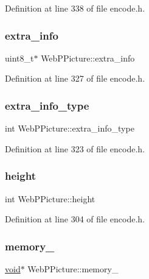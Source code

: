 Definition at line 338 of file encode.\+h.

\mbox{\label{struct_web_p_picture_a869dd7bfe02026edbc6855ea662edf48}} 
\subsubsection{\texorpdfstring{extra\_info}{extra\_info}}
{\footnotesize\ttfamily uint8\+\_\+t$\ast$ Web\+P\+Picture\+::extra\+\_\+info}



Definition at line 327 of file encode.\+h.

\mbox{\label{struct_web_p_picture_a66e5d4a176d281c0ac3a9fa4d1cdb1ae}} 
\subsubsection{\texorpdfstring{extra\_info\_type}{extra\_info\_type}}
{\footnotesize\ttfamily int Web\+P\+Picture\+::extra\+\_\+info\+\_\+type}



Definition at line 323 of file encode.\+h.

\mbox{\label{struct_web_p_picture_a033bd88269b0bde323e3cc24b24854e0}} 
\subsubsection{\texorpdfstring{height}{height}}
{\footnotesize\ttfamily int Web\+P\+Picture\+::height}



Definition at line 304 of file encode.\+h.

\mbox{\label{struct_web_p_picture_a5268908af2a7abc99cc1f4e256309eaf}} 
\subsubsection{\texorpdfstring{memory\_}{memory\_}}
{\footnotesize\ttfamily \mbox{\hyperlink{_s_d_l__opengles2__gl2ext_8h_ae5d8fa23ad07c48bb609509eae494c95}{void}}$\ast$ Web\+P\+Picture\+::memory\+\_\+}



